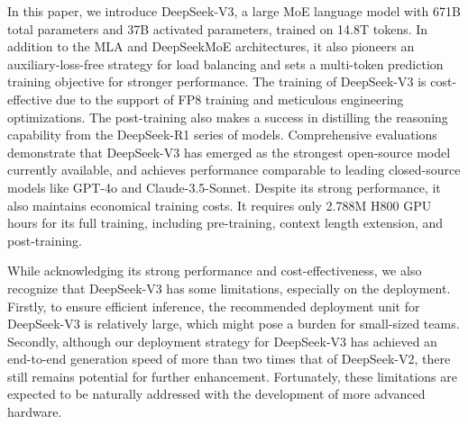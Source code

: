 \documentclass[11pt, a4paper, logo, copyright, nonumbering]{deepseek}
\newcommand{\dsvii}{DeepSeek-V2}
\newcommand{\dsattn}{MLA}
\newcommand{\dsmoe}{DeepSeekMoE}
\newcommand{\dsviii}{DeepSeek-V3}
\begin{document}
\begin{CJK*}{UTF8}{gbsn}
In this paper, we introduce \dsviii{}, a large MoE language model with 671B total parameters and 37B activated parameters, trained on 14.8T tokens. 
In addition to the \dsattn{} and \dsmoe{} architectures, it also pioneers an auxiliary-loss-free strategy for load balancing and sets a multi-token prediction training objective for stronger performance.
The training of \dsviii{} is cost-effective due to the support of FP8 training and meticulous engineering optimizations. 
The post-training also makes a success in distilling the reasoning capability from the DeepSeek-R1 series of models.
Comprehensive evaluations demonstrate that DeepSeek-V3 has emerged as the strongest open-source model currently available, and achieves performance comparable to leading closed-source models like GPT-4o and Claude-3.5-Sonnet. 
Despite its strong performance, it also maintains economical training costs. 
It requires only 2.788M H800 GPU hours for its full training, including pre-training, context length extension, and post-training. 

While acknowledging its strong performance and cost-effectiveness, we also recognize that \dsviii{} has some limitations, especially on the deployment.
Firstly, to ensure efficient inference, the recommended deployment unit for \dsviii{} is relatively large, which might pose a burden for small-sized teams.
Secondly, although our deployment strategy for \dsviii{} has achieved an end-to-end generation speed of more than two times that of \dsvii{}, there still remains potential for further enhancement.
Fortunately, these limitations are expected to be naturally addressed with the development of more advanced hardware.


\end{CJK*}
\end{document}
